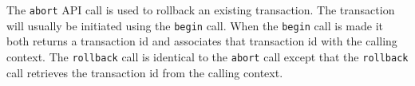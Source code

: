 The \verb+abort+ API call is used to rollback an existing transaction. The transaction will usually
be initiated using the \verb+begin+ call. When the \verb+begin+ call is made it both returns a transaction id and
associates that transaction id with the calling context. The \verb+rollback+ call is identical to the \verb+abort+ call except
that the \verb+rollback+ call retrieves the transaction id from the calling context.
